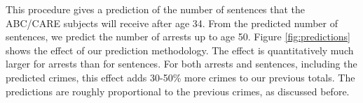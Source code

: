 %

%


\noindent This procedure gives a prediction of the number of sentences that the ABC/CARE subjects will receive after age 34. From the predicted number of sentences, we predict the number of arrests up to age 50. Figure \ref{fig:predictions} shows the effect of our prediction methodology. The effect is quantitatively much larger for arrests than for sentences. For both arrests and sentences, including the predicted crimes, this effect adds 30-50\% more crimes to our previous totals. The predictions are roughly proportional to the previous crimes, as discussed before. \\


